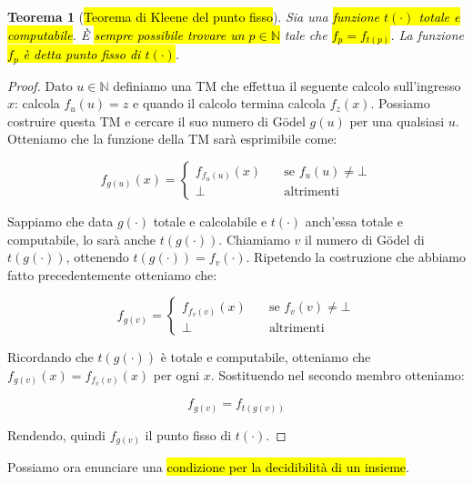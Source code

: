 \documentclass[a4paper,11pt,twoside]{article}
\theoremstyle{plain}
\newtheorem{thm}{Teorema}[section]
\theoremstyle{definition}
\theoremstyle{remark}
\begin{document}
\begin{thm}[\hl{Teorema di Kleene del punto fisso}]\label{thm:kleene-punto-fisso}
  Sia una \hl{funzione $t(\cdot)$ totale e computabile}. È \hl{sempre possibile
  trovare un $p \in \mathbb{N}$} tale che \hl{$f_p = f_{t(p)}$}. La funzione
  \hl{$f_p$ è detta punto fisso di $t(\cdot)$}.
\end{thm}
\begin{proof}
  Dato $u \in \mathbb{N}$ definiamo una TM che effettua il seguente calcolo
  sull'ingresso $x$: calcola $f_u(u) = z$ e quando il calcolo termina calcola
  $f_z(x)$. Possiamo costruire questa TM e cercare il suo numero di Gödel $g(u)$
  per una qualsiasi $u$. Otteniamo che la funzione della TM sarà esprimibile
  come:

  \[
    f_{g(u)}(x) =
    \begin{cases}
      f_{f_u(u)}(x) & \quad \text{se } f_u(u) \neq \bot \\
      \bot          & \quad \text{altrimenti}
    \end{cases}
  \]

  Sappiamo che data $g(\cdot)$ totale e calcolabile e $t(\cdot)$ anch'essa
  totale e computabile, lo sarà anche $t(g(\cdot))$. Chiamiamo $v$ il numero di
  Gödel di $t(g(\cdot))$, ottenendo $t(g(\cdot)) = f_v(\cdot)$. Ripetendo la
  costruzione che abbiamo fatto precedentemente otteniamo che:

  \[
    f_{g(v)} =
    \begin{cases}
      f_{f_v(v)}(x) & \quad \text{se } f_v(v) \neq \bot \\
      \bot          & \quad \text{altrimenti}
    \end{cases}
  \]

  Ricordando che $t(g(\cdot))$ è totale e computabile, otteniamo che
  $f_{g(v)}(x) = f_{f_v(v)}(x)$ per ogni $x$. Sostituendo nel secondo membro
  otteniamo:

  \[
    f_{g(v)} = f_{t(g(v))}
  \]

  Rendendo, quindi $f_{g(v)}$ il punto fisso di $t(\cdot)$.
\end{proof}

Possiamo ora enunciare una \hl{condizione per la decidibilità di un insieme}.
\end{document}
